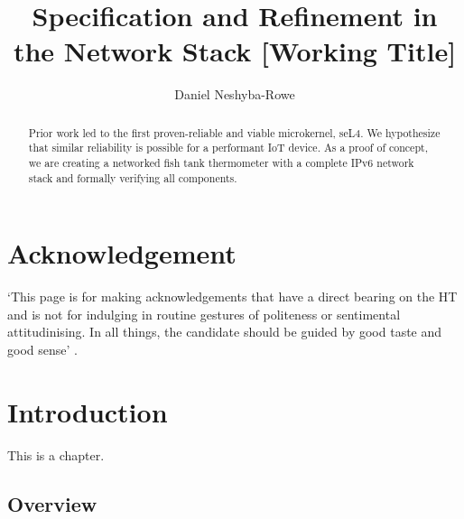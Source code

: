 \documentclass[twoside]{memoir}
\title{Specification and Refinement in the Network Stack [Working Title]} %
\author{Daniel Neshyba-Rowe}
\begin{document}
\frontmatter


\maketitle

\chapter{Acknowledgement}
`This page is for making acknowledgements that have a direct bearing on the HT and is not for indulging in routine gestures of politeness or sentimental attitudinising. In all things, the candidate should be guided by good taste and good sense' . %

\begin{abstract}
        Prior work led to the first proven-reliable and viable microkernel, seL4.
      We hypothesize that similar reliability is possible for a performant IoT device.
      As a proof of concept, we are creating a networked fish tank thermometer
      with a complete IPv6 network stack and formally verifying all components.

\end{abstract}

\tableofcontents


\mainmatter

\chapter{Introduction}

This is a chapter.

\section{Overview}
\end{document}
